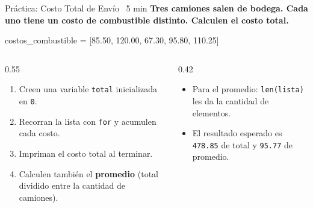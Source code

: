 \documentclass[aspectratio=169, 11pt]{beamer}
\begin{document}
\begin{frame}[fragile,shrink=25]{Práctica: Costo Total de Envío \hfill
    {\normalsize\color{arcaRed}\faClock\ 5 min}}
  \vspace{-6pt}
  {\small\color{arcaDark}\bfseries
    Tres camiones salen de bodega. Cada uno tiene un costo de
    combustible distinto. Calculen el costo total.}

  \vspace{4pt}
  \begin{pyblock}
costos_combustible = [85.50, 120.00, 67.30, 95.80, 110.25]
  \end{pyblock}

  \vspace{6pt}
  \begin{columns}[T]
    \begin{column}{0.55\textwidth}
      {\footnotesize
      \begin{enumerate}\setlength{\itemsep}{5pt}
        \item Creen una variable \texttt{total} inicializada en \texttt{0}.
        \item Recorran la lista con \texttt{for} y acumulen cada costo.
        \item Impriman el costo total al terminar.
        \item Calculen también el \textbf{promedio}
              (total dividido entre la cantidad de camiones).
      \end{enumerate}
      }
    \end{column}

    \begin{column}{0.42\textwidth}
      {\footnotesize\color{textMuted}
      \begin{itemize}\setlength{\itemsep}{4pt}
        \item[{\color{arcaRed}\scriptsize\faLightbulb}]
          Para el promedio: \texttt{len(lista)}
          les da la cantidad de elementos.
        \item[{\color{arcaRed}\scriptsize\faLightbulb}]
          El resultado esperado es
          \texttt{478.85} de total y
          \texttt{95.77} de promedio.
      \end{itemize}
      }
    \end{column}
  \end{columns}
\end{frame}
\end{document}
